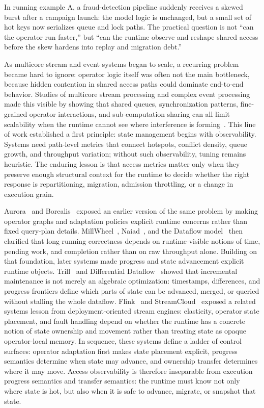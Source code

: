 \documentclass[acmsmall,screen,review]{acmart}
\begin{document}
In running example A, a fraud-detection pipeline suddenly receives a skewed burst after a campaign launch: the model logic is unchanged, but a small set of hot keys now serializes queue and lock paths. The practical question is not ``can the operator run faster,'' but ``can the runtime observe and reshape shared access before the skew hardens into replay and migration debt.''

As multicore stream and event systems began to scale, a recurring problem became hard to ignore: operator logic itself was often not the main bottleneck, because hidden contention in shared access paths could dominate end-to-end behavior. Studies of multicore stream processing and complex event processing made this visible by showing that shared queues, synchronization patterns, fine-grained operator interactions, and sub-computation sharing can all limit scalability when the runtime cannot see where interference is forming~\cite{zhang2017revisiting,zhang2017mqo}. This line of work established a first principle: state management begins with observability. Systems need path-level metrics that connect hotspots, conflict density, queue growth, and throughput variation; without such observability, tuning remains heuristic. The enduring lesson is that access metrics matter only when they preserve enough structural context for the runtime to decide whether the right response is repartitioning, migration, admission throttling, or a change in execution grain.

Aurora~\cite{abadi2003aurora} and Borealis~\cite{abadi2005borealis} exposed an earlier version of the same problem by making operator graphs and adaptation policies explicit runtime concerns rather than fixed query-plan details. MillWheel~\cite{akidau2013millwheel}, Naiad~\cite{murray2013naiad}, and the Dataflow model~\cite{akidau2015dataflow} then clarified that long-running correctness depends on runtime-visible notions of time, pending work, and completion rather than on raw throughput alone. Building on that foundation, later systems made progress and state advancement explicit runtime objects. Trill~\cite{chandramouli2014trill} and Differential Dataflow~\cite{murray2013differential} showed that incremental maintenance is not merely an algebraic optimization: timestamps, differences, and progress frontiers define which parts of state can be advanced, merged, or queried without stalling the whole dataflow. Flink~\cite{carbone2015flink} and StreamCloud~\cite{gulisano2012streamcloud} exposed a related systems lesson from deployment-oriented stream engines: elasticity, operator state placement, and fault handling depend on whether the runtime has a concrete notion of state ownership and movement rather than treating state as opaque operator-local memory. In sequence, these systems define a ladder of control surfaces: operator adaptation first makes state placement explicit, progress semantics determine when state may advance, and ownership transfer determines where it may move. Access observability is therefore inseparable from execution progress semantics and transfer semantics: the runtime must know not only where state is hot, but also when it is safe to advance, migrate, or snapshot that state.
\end{document}
